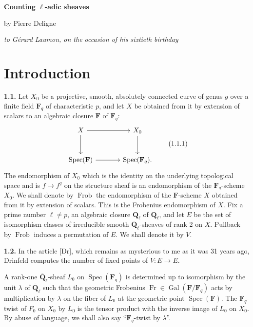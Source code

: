 \documentclass[11pt]{article}
\newcommand{\Fq}{\mathbf{F}_q}
\newcommand{\F}{\mathbf{F}}
\newcommand{\Qbl}{\overline{\mathbf{Q}}_{\ell}}
\newcommand{\Ql}{\mathbf{Q}_{\ell}}
\newcommand{\Spec}{\operatorname{Spec}}
\newcommand{\Gal}{\operatorname{Gal}}
\newcommand{\Frob}{\operatorname{Frob}}
\newcommand{\Fr}{\operatorname{Fr}}
\newcommand{\para}[1]{\medskip\noindent\textbf{#1}\enspace}
\begin{document}
\begin{center}
{\Large\bfseries Counting \(\ell\)-adic sheaves}\par
\vspace{0.35em}
{by Pierre Deligne}\par
\vspace{0.6em}
{\itshape to Gérard Laumon, on the occasion of his sixtieth birthday}
\end{center}

\section{Introduction}

\para{1.1.} Let \(X_0\) be a projective, smooth, absolutely connected curve of genus \(g\) over a finite field \(\Fq\) of characteristic \(p\), and let \(X\) be obtained from it by extension of scalars to an algebraic closure \(\F\) of \(\Fq\):
\begin{equation}
\begin{tikzcd}[ampersand replacement=\&,column sep=large,row sep=large]
X \arrow[r] \arrow[d] \& X_0 \arrow[d] \\
\Spec(\F) \arrow[r] \& \Spec(\Fq).
\end{tikzcd}
\tag{1.1.1}
\end{equation}
The endomorphism of \(X_0\) which is the identity on the underlying topological space and is \(f\mapsto f^q\) on the structure sheaf is an endomorphism of the \(\Fq\)-scheme \(X_0\). We shall denote by \(\Frob\) the endomorphism of the \(\F\)-scheme \(X\) obtained from it by extension of scalars. This is the Frobenius endomorphism of \(X\). Fix a prime number \(\ell\ne p\), an algebraic closure \(\Qbl\) of \(\Ql\), and let \(E\) be the set of isomorphism classes of irreducible smooth \(\Qbl\)-sheaves of rank \(2\) on \(X\). Pullback by \(\Frob\) induces a permutation of \(E\). We shall denote it by \(V\).

\para{1.2.} In the article [Dr], which remains as mysterious to me as it was 31 years ago, Drinfeld computes the number of fixed points of \(V:E\to E\).

A rank-one \(\Qbl\)-sheaf \(L_0\) on \(\Spec(\Fq)\) is determined up to isomorphism by the unit \(\lambda\) of \(\Qbl\) such that the geometric Frobenius \(\Fr\in\Gal(\F/\Fq)\) acts by multiplication by \(\lambda\) on the fiber of \(L_0\) at the geometric point \(\Spec(\F)\). The \(\Fq\)-twist of \(F_0\) on \(X_0\) by \(L_0\) is the tensor product with the inverse image of \(L_0\) on \(X_0\). By abuse of language, we shall also say ``\(\Fq\)-twist by \(\lambda\)''.
\end{document}
